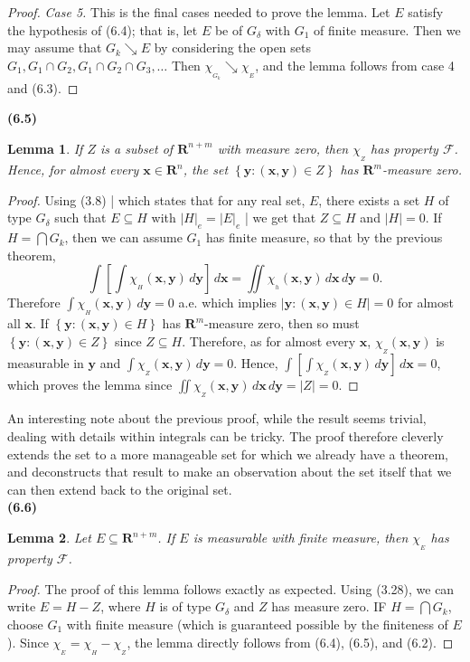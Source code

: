 \documentclass[12pt]{book}
\renewcommand{\vec}[1]{\mathbf{#1}}
\newcommand{\set}[1]{\left\{ #1 \right\}}
\renewcommand{\cal}[1]{\mathscr{#1}}
\renewcommand{\i}{\cap}
\newcommand{\bi}{\bigcap}
\renewcommand{\ss}{\subseteq}
\newcommand{\ind}[1]{\chi_{_{#1}}}
\newcommand{\R}{\mathbf{R}}
\renewcommand{\.}{\mkern1mu}
\newcounter{case}
\newcommand{\abs}[1]{\left| #1 \right|}
\newcommand{\downto}{\searrow}
\newenvironment{pf}{\begin{proof}\setlength{\parindent}{\normalparindent}\setlength{\parskip}{\normalparskip}}{\end{proof}}
\theoremstyle{theorem}
\newtheorem{lemma}{Lemma}
\newcommand{\thmindent}{\setlength{\parindent}{17pt}}
\newenvironment{lem}[1]
	{\noindent \textbf{#1}\hspace{2ex}\begin{minipage}[t]{\linewidth - \widthof{\textbf{(#1)}}}\begin{lemma}\thmindent }
	{\end{lemma}\end{minipage}\medskip}
\newlength{\normalparindent}
\newlength{\normalparskip}
\begin{document}
\begin{pf}
		\textit{Case 5.} This is the final cases needed to prove the lemma. Let $E$ satisfy the hypothesis of (6.4); that is, let $E$ be of $G_\delta$ with $G_1$ of finite measure. Then we may assume that $G_k \downto E$ by considering the open sets $G_1, G_1\i G_2, G_1\i G_2\i G_3, \ldots$ Then $\ind{G_k}\downto \ind E$, and the lemma follows from case 4 and (6.3).
		\end{pf}
		
	\begin{lem}{(6.5)}
		If $Z$ is a subset of $\R^{n+m}$ with measure zero, then $\ind Z$ has property $\cal F$. Hence, for almost every $\vec x \in \R^n$, the set $\set{\vec y : (\vec x, \vec y) \in Z}$ has $\R^m$-measure zero.
	\end{lem}
		\begin{pf}
			Using (3.8) | which states that for any real set, $E$, there exists a set $H$ of type $G_\delta$ such that $E \ss H$ with $\abs{H}_e = \abs{E}_e$ | we get that $Z \ss H$ and $\abs{H} = 0$. If $H = \bi G_k$, then we can assume $G_1$ has finite measure, so that by the previous theorem,
				\[ \int\left[\int\ind H(\vec x, \vec y)\, d\vec y\right]\, d\vec x = \iint \ind h(\vec x, \vec y)\, d\vec x\, d\vec y = 0. \]
			Therefore $\int \ind H(\vec x, \vec y)\, d\vec y = 0$ a.e. which implies $\abs{\vec y: (\vec x, \vec y) \in H} = 0$ for almost all $\vec x$. If $\set{\vec y : (\vec x, \vec y) \in H}$ has $\R^m$-measure zero, then so must $\set{\vec y : (\vec x, \vec y) \in Z}$ since $Z \ss H$. Therefore, as for almost every $\vec x$, $\ind Z (\vec x, \vec y)$ is measurable in $\vec y$ and $\int \ind Z (\vec x, \vec y)\, d\vec y = 0$. Hence, $\int[ \int \ind Z (\vec x, \vec y)\, d\vec y]\, d\vec x = 0$, which proves the lemma since $\iint \ind Z (\vec x, \vec y)\, d\vec x\, d\vec y = \abs{Z} = 0$.
		\end{pf}
		
	An interesting note about the previous proof, while the result seems trivial, dealing with details within integrals can be tricky. The proof therefore cleverly extends the set to a more manageable set for which we already have a theorem, and deconstructs that result to make an observation about the set itself that we can then extend back to the original set.\\
	
	\begin{lem}{(6.6)}
		Let $E\ss \R^{n+m}$. If $E$ is measurable with finite measure, then $\ind E$ has property $\cal F$.
	\end{lem}
		\begin{pf}
			The proof of this lemma follows exactly as expected. Using (3.28), we can write $E = H - Z$, where $H$ is of type $G_\delta$ and $Z$ has measure zero. IF $H = \bi G_k$, choose $G_1$ with finite measure (which is guaranteed possible by the finiteness of $E$). Since $\ind E = \ind H - \ind Z$, the lemma directly follows from (6.4), (6.5), and (6.2).
		\end{pf}
	
\end{document}
